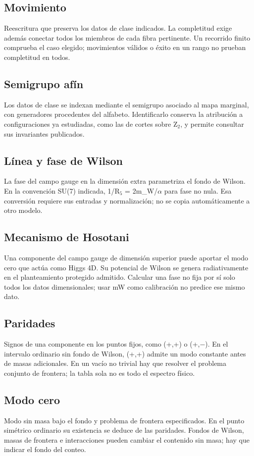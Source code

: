 \documentclass[11pt,a4paper]{article}
\begin{document}
\subsection*{Movimiento}
Reescritura que preserva los datos de clase indicados. La completitud exige además conectar todos los miembros de cada fibra pertinente. Un recorrido finito comprueba el caso elegido; movimientos válidos o éxito en un rango no prueban completitud en todos.

\subsection*{Semigrupo afín}
Los datos de clase se indexan mediante el semigrupo asociado al mapa marginal, con generadores procedentes del alfabeto. Identificarlo conserva la atribución a configuraciones ya estudiadas, como las de cortes sobre Z\ensuremath{{}_{2}}, y permite consultar sus invariantes publicados.

\subsection*{Línea y fase de Wilson}
La fase del campo gauge en la dimensión extra parametriza el fondo de Wilson. En la convención SU(7) indicada, 1/R\ensuremath{{}_{5}} = 2m\_W/\ensuremath{\alpha} para fase no nula. Esa conversión requiere sus entradas y normalización; no se copia automáticamente a otro modelo.

\subsection*{Mecanismo de Hosotani}
Una componente del campo gauge de dimensión superior puede aportar el modo cero que actúa como Higgs 4D. Su potencial de Wilson se genera radiativamente en el planteamiento protegido admitido. Calcular una fase no fija por sí solo todos los datos dimensionales; usar mW como calibración no predice ese mismo dato.

\subsection*{Paridades}
Signos de una componente en los puntos fijos, como (+,+) o (+,\ensuremath{-}). En el intervalo ordinario sin fondo de Wilson, (+,+) admite un modo constante antes de masas adicionales. En un vacío no trivial hay que resolver el problema conjunto de frontera; la tabla sola no es todo el espectro físico.

\subsection*{Modo cero}
Modo sin masa bajo el fondo y problema de frontera especificados. En el punto simétrico ordinario su existencia se deduce de las paridades. Fondos de Wilson, masas de frontera e interacciones pueden cambiar el contenido sin masa; hay que indicar el fondo del conteo.
\end{document}
